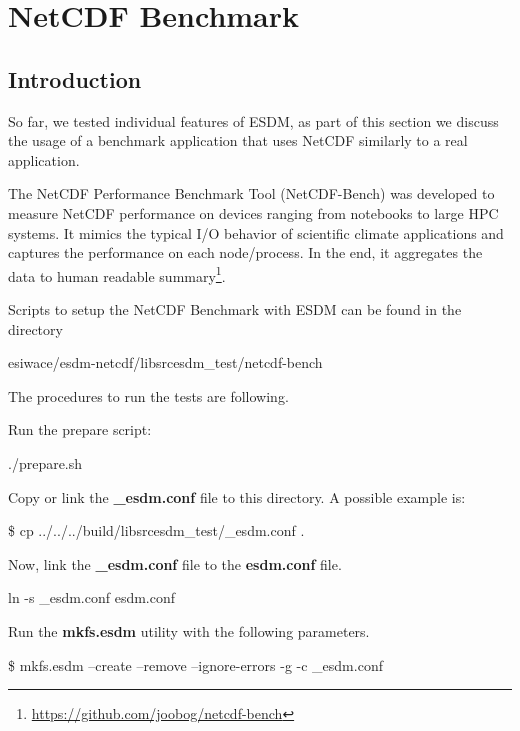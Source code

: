 \chapter{NetCDF Benchmark}
\label{ch:bench}

\section{Introduction}

So far, we tested individual features of ESDM, as part of this section we discuss the usage of a benchmark application that uses NetCDF similarly to a real application.

The NetCDF Performance Benchmark Tool (NetCDF-Bench) was developed to measure NetCDF performance on devices ranging from notebooks to large HPC systems. It mimics the typical I/O behavior of scientific climate applications and captures the performance on each node/process. In the end, it aggregates the data to human readable summary\footnote{\url{https://github.com/joobog/netcdf-bench}}.

Scripts to setup the NetCDF Benchmark with ESDM can be found in the directory

\begin{framed}
esiwace/esdm-netcdf/libsrcesdm\_test/netcdf-bench
\end{framed}

The procedures to run the tests are following.

Run the prepare script:

\begin{framed}
./prepare.sh
\end{framed}

Copy or link the \textbf{\_esdm.conf} file to this directory. A possible example is:

\begin{framed}
\$ cp ../../../build/libsrcesdm\_test/\_esdm.conf .
\end{framed}

Now, link the \textbf{\_esdm.conf} file to the \textbf{esdm.conf} file.

\begin{framed}
ln -s \_esdm.conf esdm.conf
\end{framed}

Run the \textbf{mkfs.esdm} utility with the following parameters.

\begin{framed}
\$ mkfs.esdm --create --remove --ignore-errors -g -c \_esdm.conf
\end{framed}

